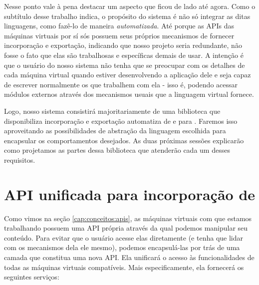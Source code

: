 
    Nesse ponto vale à pena destacar um aspecto que ficou de lado até agora.
    Como o subtítulo desse trabalho indica, o propósito do sistema é não só
    integrar as ditas linguagens, como fazê-lo de maneira \textit{automatizada}.
    Até porque as APIs das máquinas virtuais por sí sós possuem seus próprios
    mecanismos de fornecer incorporação e exportação, indicando que nosso
    projeto seria redundante, não fosse o fato que elas são trabalhosas e
    específicas demais de usar. A intenção é que o usuário do nosso sistema não
    tenha que se preocupar com os detalhes de cada máquina virtual quando
    estiver desenvolvendo a aplicação dele e seja capaz de escrever normalmente
    os  que trabalhem com ela - isso é, podendo acessar módulos
    externos através dos mecanismos usuais que a linguagem virtual fornece.

    Logo, nosso sistema consistirá majoritariamente de uma biblioteca \CXX{}
    que disponibiliza incorporação e exportação automatiza de e para .
    Faremos isso aproveitando as possibilidades de abstração da linguagem
    escolhida para encapsular os comportamentos desejados. As duas próximas
    sessões explicarão como projetamos as partes dessa biblioteca que atenderão
    cada um desses requisitos.

  \section{API unificada para incorporação de }
  \label{cap:estrutura:opa}

    Como vimos na seção \ref{cap:conceitos:apis}, as máquinas virtuais com que
    estamos trabalhando possuem uma API própria através da qual podemos
    manipular seu conteúdo. Para evitar que o usuário acesse elas diretamente
    (e tenha que lidar com os mecanismos dela ele mesmo), podemos encapsulá-las
    por trás de uma camada que constitua uma nova API. Ela unificará o acesso às
    funcionalidades de todas as máquinas virtuais compatíveis. Mais
    especificamente, ela fornecerá os seguintes serviços:

